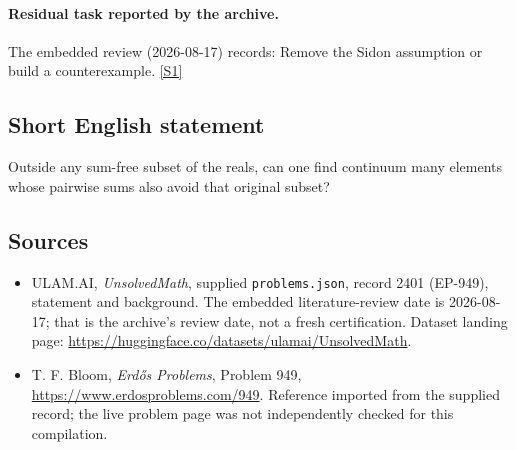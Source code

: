 \documentclass[11pt,a4paper]{article}
\newcommand{\sref}[2]{\hyperlink{source:#1:#2}{[S#2]}}
\begin{document}
\paragraph{Residual task reported by the archive.}

The embedded review (2026-08-17) records: Remove the Sidon assumption or build a counterexample. \sref{2401}{1}

\subsection{Short English statement}

Outside any sum-free subset of the reals, can one find continuum many elements whose pairwise sums also avoid that original subset?

\subsection{Sources}

{\small

\begin{itemize}

\item[\hypertarget{source:2401:1}{S1}] ULAM.AI, \emph{UnsolvedMath}, supplied \texttt{problems.json}, record 2401 (EP-949), statement and background. The embedded literature-review date is 2026-08-17; that is the archive’s review date, not a fresh certification. Dataset landing page: \url{https://huggingface.co/datasets/ulamai/UnsolvedMath}.

\item[\hypertarget{source:2401:2}{S2}] T. F. Bloom, \emph{Erdős Problems}, Problem 949, \url{https://www.erdosproblems.com/949}. Reference imported from the supplied record; the live problem page was not independently checked for this compilation.

\end{itemize}

}

\label{end:2401}
\end{document}

